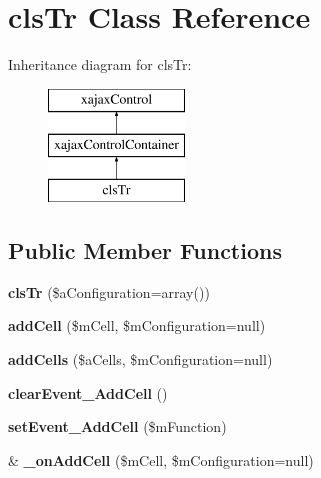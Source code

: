 \hypertarget{classclsTr}{
\section{clsTr Class Reference}
\label{classclsTr}
}
Inheritance diagram for clsTr:\begin{figure}[H]
\begin{center}
\leavevmode
\includegraphics[height=3.000000cm]{classclsTr}
\end{center}
\end{figure}
\subsection*{Public Member Functions}
\begin{DoxyCompactItemize}
\item 
\hypertarget{classclsTr_ac9ed0fdc6bce1f723794cc9cd37b1c75}{
{\bfseries clsTr} (\$aConfiguration=array())}
\label{classclsTr_ac9ed0fdc6bce1f723794cc9cd37b1c75}

\item 
\hypertarget{classclsTr_af6cf865cba2094db04ba375d08cbdb08}{
{\bfseries addCell} (\$mCell, \$mConfiguration=null)}
\label{classclsTr_af6cf865cba2094db04ba375d08cbdb08}

\item 
\hypertarget{classclsTr_aca5a607f498e7b017fc8f38ec915a209}{
{\bfseries addCells} (\$aCells, \$mConfiguration=null)}
\label{classclsTr_aca5a607f498e7b017fc8f38ec915a209}

\item 
\hypertarget{classclsTr_a44272922e250d6999671295001e6c584}{
{\bfseries clearEvent\_\-AddCell} ()}
\label{classclsTr_a44272922e250d6999671295001e6c584}

\item 
\hypertarget{classclsTr_a3d8cd6fc4d5bf45fb44c8e3dd6b860c6}{
{\bfseries setEvent\_\-AddCell} (\$mFunction)}
\label{classclsTr_a3d8cd6fc4d5bf45fb44c8e3dd6b860c6}

\item 
\hypertarget{classclsTr_a72f82e5edc5c241d89bdcbe9fc4e7ead}{
\& {\bfseries \_\-onAddCell} (\$mCell, \$mConfiguration=null)}
\label{classclsTr_a72f82e5edc5c241d89bdcbe9fc4e7ead}

\end{DoxyCompactItemize}

